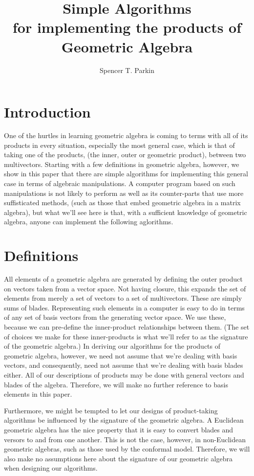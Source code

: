 \documentclass{article}
\title{Simple Algorithms\\for implementing the products of\\Geometric Algebra}
\author{Spencer T. Parkin}
\begin{document}
\maketitle

\section*{Introduction}

One of the hurtles in learning geometric algebra is coming to terms with all of its
products in every situation, especially the most general case, which is that of
taking one of the products, (the inner, outer or geometric product),
between two multivectors.  Starting with a few definitions in geometric algebra,
however, we show in this paper that there are simple algorithms for implementing
this general case in terms of algebraic manipulations.  A computer program based
on such manipulations is not likely to perform as well as its counter-parts that
use more suffisticated methods, (such as those that embed geometric algebra in a matrix
algebra), but what we'll see here is that, with a sufficient knowledge of geometric
algebra, anyone can implement the following aglorithms.

\section*{Definitions}

All elements of a geometric algebra are generated by defining the outer product
on vectors taken from a vector space.  Not having closure, this expands the set
of elements from merely a set of vectors to a set of multivectors.  These are
simply sums of blades.  Representing such elements in a computer is easy to do in terms
of any set of basis vectors from the generating vector space.  We use these,
because we can pre-define the inner-product relationships between them.
(The set of choices we make for these inner-products is what we'll refer
to as the signature of the geometric algebra.)  In deriving our algorithms for
the products of geometric algebra, however, we need not assume that we're dealing
with basis vectors, and consequently, need not assume that we're dealing with
basis blades either.  All of our descriptions of products may be done with general
vectors and blades of the algebra.  Therefore, we will make no further reference
to basis elements in this paper.

Furthermore, we might be tempted to let our designs of product-taking algorithms
be influenced by the signature of the geometric algebra.  A Euclidean geometric
algebra has the nice property that it is easy to convert blades and versors to and
from one another.  This is not the case, however, in non-Euclidean geometric algebras, such as
those used by the conformal model.  Therefore, we will also make no assumptions here about the
signature of our geometric algebra when designing our algorithms.
\end{document}
